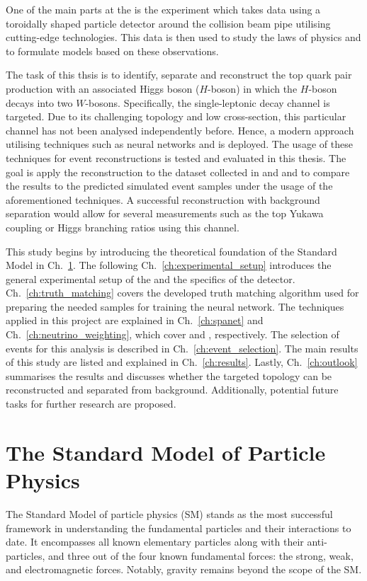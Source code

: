 \documentclass[bachelor,ngerman,english]{GAUBM}
\begin{document}
One of the main parts at the \lhc is the \atlas experiment which takes data using a toroidally shaped particle detector around the collision beam pipe utilising cutting-edge technologies. This data is then used to study the laws of physics and to formulate models based on these observations.

The task of this thsis is to identify, separate and reconstruct the top quark pair production with an associated Higgs boson ($H$-boson) in which the $H$-boson decays into two $W$-bosons. Specifically, the single-leptonic decay channel is targeted. Due to its challenging topology and low cross-section, this particular channel has not been analysed independently before. Hence, a modern approach utilising techniques such as neural networks and \NW is deployed. The usage of these techniques for event reconstructions is tested and evaluated in this thesis. The goal is apply the reconstruction to the \atlas dataset collected in \runi and \runii and to compare the results to the predicted simulated event samples under the usage of the aforementioned techniques. A successful reconstruction with background separation would allow for several measurements such as the top Yukawa coupling or Higgs branching ratios using this channel. 

This study begins by introducing the theoretical foundation of the Standard Model in Ch.~\ref{ch:standard_model}. The following Ch.~\ref{ch:experimental_setup} introduces the general experimental setup of the \lhc and the specifics of the \atlas detector. Ch.~\ref{ch:truth_matching} covers the developed truth matching algorithm used for preparing the needed samples for training the neural network. The techniques applied in this project are explained in Ch.~\ref{ch:spanet} and Ch.~\ref{ch:neutrino_weighting}, which cover \spanet and \NW, respectively. The selection of events for this analysis is described in Ch.~\ref{ch:event_selection}. The main results of this study are listed and explained in Ch.~\ref{ch:results}. Lastly, Ch.~\ref{ch:outlook} summarises the results and discusses whether the targeted topology can be reconstructed and separated from background. Additionally, potential future tasks for further research are proposed.  



\chapter{The Standard Model of Particle Physics}
\label{ch:standard_model}
The Standard Model of particle physics (SM) \cite{theory:general_sm} stands as the most successful framework in understanding the fundamental particles and their interactions to date. It encompasses all known elementary particles along with their anti-particles, and three out of the four known fundamental forces: the strong, weak, and electromagnetic forces. Notably, gravity remains beyond the scope of the SM.
\end{document}
